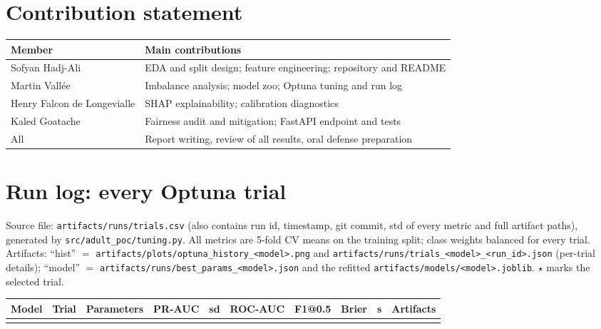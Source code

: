 \documentclass[10.5pt,a4paper]{article}
\newcommand{\code}[1]{\texttt{\small #1}}
\begin{document}
\section*{Contribution statement}
\begin{center}\small
\begin{tabular}{ll}
\toprule
Member & Main contributions \\
\midrule
Sofyan Hadj-Ali & EDA and split design; feature engineering; repository and README \\
Martin Vallée & Imbalance analysis; model zoo; Optuna tuning and run log \\
Henry Falcon de Longevialle & SHAP explainability; calibration diagnostics \\
Kaled Goatache & Fairness audit and mitigation; FastAPI endpoint and tests \\
All & Report writing, review of all results, oral defense preparation \\
\bottomrule
\end{tabular}
\end{center}

\clearpage
\appendix
\sloppy
\section{Run log: every Optuna trial}
\label{app:runlog}
Source file: \code{artifacts/runs/trials.csv} (also contains run id, timestamp, git commit, std of every
metric and full artifact paths), generated by \code{src/adult\_poc/tuning.py}. All metrics are 5-fold CV means on
the training split; class weights balanced for every trial. Artifacts: ``hist'' $=$
\code{artifacts/plots/optuna\_history\_<model>.png} and \code{artifacts/runs/trials\_<model>\_<run\_id>.json}
(per-trial details); ``model'' $=$ \code{artifacts/runs/best\_params\_<model>.json} and the refitted
\code{artifacts/models/<model>.joblib}. $\star$ marks the selected trial.

{\scriptsize
\setlength{\tabcolsep}{3pt}
\begin{longtable}{llp{5.6cm}ccccccl}
\toprule
Model & Trial & Parameters & PR-AUC & sd & ROC-AUC & F1@0.5 & Brier & s & Artifacts \\
\midrule
\endhead
{}{tables/run_log.tex}
\bottomrule
\end{longtable}}
\end{document}
